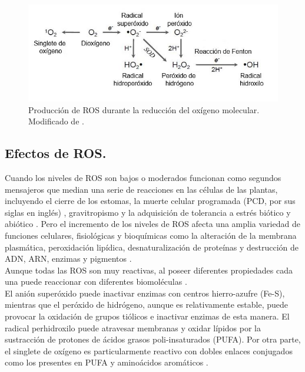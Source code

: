 \begin{figure}[hbtp]
	\centering
	\includegraphics[scale=0.75]{Imagenes/ROSprod}
	\caption{Producci\'on de ROS durante la reducci\'on del ox\'igeno molecular. Modificado de \cite{imlay2008cellular, gill2010reactive}. }
	\label{ProdROS}
\end{figure}

\subsection{Efectos de ROS.}

Cuando los niveles de ROS son bajos o moderados funcionan como segundos mensajeros que median una serie de reacciones en las c\'elulas de las plantas, incluyendo el cierre de los estomas, la muerte celular programada (PCD, por sus siglas en ingl\'es) \citep{petrov2015ros}, gravitropismo \citep{wassim2013putative} y la adquisici\'on de tolerancia a estr\'es bi\'otico y abi\'otico \citep{nath2017reactive}. Pero el incremento de los niveles de ROS afecta una amplia variedad de funciones celulares, fisiol\'ogicas y bioqu\'imicas como la alteraci\'on de la membrana plasm\'atica, peroxidaci\'on lip\'idica, desnaturalizaci\'on de prote\'inas y destrucci\'on de ADN, ARN, enzimas y pigmentos \citep{xie2019roles}.\\
 
Aunque todas las ROS son muy reactivas, al poseer diferentes propiedades cada una puede reaccionar con diferentes biomol\'eculas \citep{peralta2012defensa}.\\

El ani\'on super\'oxido puede inactivar enzimas con centros hierro-azufre (Fe-S), mientras que el per\'oxido de hidr\'ogeno, aunque es relativamente estable, puede provocar la oxidación de grupos tiólicos e inactivar enzimas de esta manera. El radical perhidroxilo puede atravesar membranas y oxidar lípidos por la sustracción de protones de ácidos grasos poli-insaturados (PUFA). Por otra parte, el singlete de ox\'igeno es particularmente reactivo con dobles enlaces conjugados como los presentes en PUFA y aminoácidos aromáticos \citep{mittler2002oxidative, moller2007oxidative}.\\

